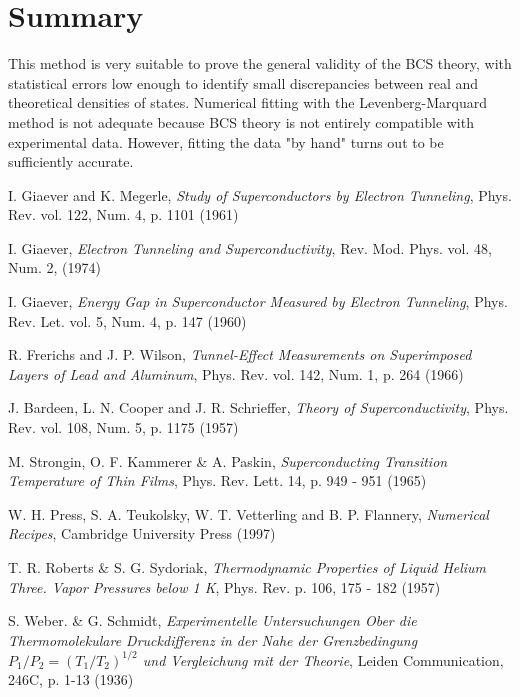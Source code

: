 \documentclass[twocolumn, twoside,a4paper,10pt]{article}
\begin{document}



\section*{Summary}
This method is very suitable to prove the general validity of the BCS theory, with statistical errors low enough to identify small discrepancies between real and theoretical densities of states. Numerical fitting with the Levenberg-Marquard method is not adequate because BCS theory is not entirely compatible with experimental data. However, fitting the data "by hand" turns out to be sufficiently accurate.


\begin{thebibliography}{99}

 I. Giaever and K. Megerle, \emph{Study of Superconductors by Electron Tunneling}, Phys. Rev. vol. 122, Num. 4, p. 1101 (1961)

 I. Giaever, \emph{Electron Tunneling and Superconductivity}, Rev. Mod. Phys. vol. 48, Num. 2, (1974)

 I. Giaever, \emph{Energy Gap in Superconductor Measured by Electron Tunneling}, Phys. Rev. Let. vol. 5, Num. 4, p. 147 (1960)

 R. Frerichs and J. P. Wilson, \emph{Tunnel-Effect Measurements on Superimposed Layers of Lead and Aluminum}, Phys. Rev. vol. 142, Num. 1, p. 264 (1966)

 J. Bardeen, L. N. Cooper and J. R. Schrieffer, \emph{Theory of Superconductivity}, Phys. Rev. vol. 108, Num. 5, p. 1175 (1957)

 M. Strongin, O. F. Kammerer \& A. Paskin, \emph{Superconducting Transition Temperature of Thin Films},  Phys. Rev. Lett. 14, p. 949 - 951 (1965)

 W. H. Press, S. A. Teukolsky, W. T. Vetterling and B. P. Flannery, \emph{Numerical Recipes},  Cambridge University Press (1997)

 T. R. Roberts \& S. G. Sydoriak, \emph{Thermodynamic Properties of Liquid Helium Three. Vapor Pressures below 1 K}, Phys. Rev. p. 106, 175 - 182 (1957) 

 S. Weber. \& G. Schmidt,  \emph{Experimentelle Untersuchungen Ober die Thermomolekulare Druckdifferenz in der Nahe der Grenzbedingung $P_1/P_2 = (T_1/T_2)^{1/2}$ und Vergleichung mit der Theorie}, Leiden Communication, 246C, p. 1-13 (1936) 

\end{thebibliography}

\ednotemessage
\end{document}
